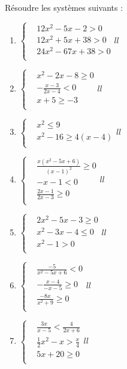 \begin{exercice}
Résoudre les systèmes suivants :
\begin{multicols}{2}
\begin{enumerate}
\item $\left\{ \begin{array}{ll}
  & 12{{x}^{2}}-5x-2>0 \\ 
 & 12{{x}^{2}}+5x+38>0 \\ 
 & 24{{x}^{2}}-67x+38>0 \\ 
\end{array}{ll} \right.$
\item $\left\{ \begin{array}{ll}
  & {{x}^{2}}-2x-8\ge 0 \\ 
 & -\frac{x-3}{2x-4}<0 \\ 
 & x+5\ge -3 \\ 
\end{array}{ll} \right.$

\item $\left\{ \begin{array}{ll}
  & {{x}^{2}}\le 9 \\ 
 & {{x}^{2}}-16\ge 4\left( x-4 \right) \\ 
\end{array}{ll} \right.$

\item $\left\{ \begin{array}{ll}
  & \frac{x\left( {{x}^{2}}-5x+6 \right)}{{{\left( x-1 \right)}^{2}}}\ge 0 \\ 
 & -x-1<0 \\ 
 & \frac{2x-1}{2x-3}\ge 0 \\ 
\end{array}{ll} \right.$
\item $\left\{ \begin{array}{ll}
  & 2{{x}^{2}}-5x-3\ge 0 \\ 
 & {{x}^{2}}-3x-4\le 0 \\ 
 & {{x}^{2}}-1>0 \\ 
\end{array}{ll} \right.$
\item $\left\{ \begin{array}{ll}
  & \frac{-5}{{{x}^{2}}-5x+6}<0 \\ 
 & -\frac{x-4}{-x-5}\ge 0 \\ 
 & \frac{-8x}{{{x}^{2}}+9}\ge 0 \\ 
\end{array}{ll} \right.$
\item $\left\{ \begin{array}{ll}
  & \frac{3x}{x-5}<\frac{4}{2x+6} \\ 
 & \frac{1}{2}{{x}^{2}}-x>\frac{x}{4} \\ 
 & 5x+20\ge 0 \\ 
\end{array}{ll} \right.$
\end{enumerate}
\end{multicols}
\end{exercice}



